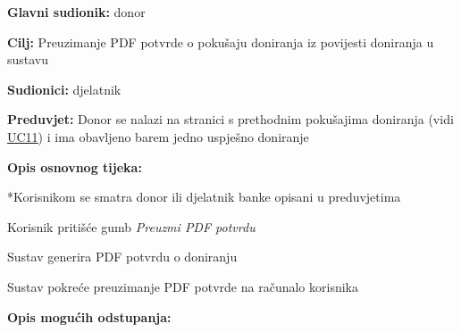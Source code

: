 					\noindent {}
					\begin{packed_item} \label{UC12}
	
						\item \textbf{Glavni sudionik: }donor
						\item  \textbf{Cilj:} Preuzimanje PDF potvrde o pokušaju doniranja iz povijesti doniranja u sustavu
						\item  \textbf{Sudionici:} djelatnik
						\item  \textbf{Preduvjet:} Donor se nalazi na stranici s prethodnim pokušajima doniranja (vidi \hyperref[UC11]{UC11}) i ima obavljeno barem jedno uspješno doniranje
						\item  \textbf{Opis osnovnog tijeka:}
						
						*Korisnikom se smatra donor ili djelatnik banke opisani u preduvjetima
						\item[] \begin{packed_enum}
	                        \item Korisnik pritišće gumb \textit{Preuzmi PDF potvrdu} 
	                        \item Sustav generira PDF potvrdu o doniranju
	                        \item Sustav pokreće preuzimanje PDF potvrde na računalo korisnika
						\end{packed_enum}
						
						\item  \textbf{Opis mogućih odstupanja:}
						
					\end{packed_item}
					

